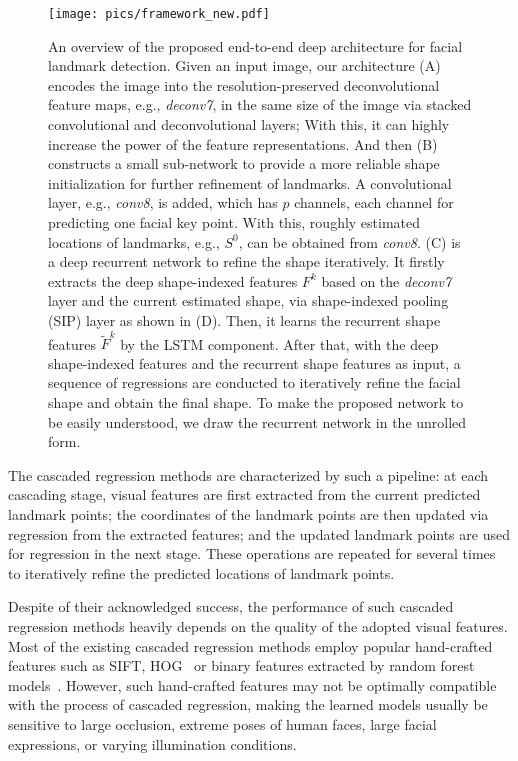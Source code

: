 \documentclass[journal]{IEEEtran}
\begin{document}
\begin{figure*}
\centering
    \texttt{[image: pics/framework\_new.pdf]}
  \caption{An overview of the proposed end-to-end deep architecture for facial landmark detection. Given an input image, our architecture (A) encodes the image into the resolution-preserved deconvolutional feature maps, e.g., \textit{deconv7}, in the same size of the image via stacked convolutional and deconvolutional layers; With this, it can highly increase the power of the feature representations. And then (B) constructs a small sub-network to provide a more reliable shape initialization for further refinement of landmarks. A convolutional layer, e.g., \textit{conv8}, is added, which has $p$ channels, each channel for predicting one facial key point. With this, roughly estimated locations of landmarks, e.g., $S^0$, can be obtained from \textit{conv8}. (C) is a deep recurrent network to refine the shape iteratively. It firstly extracts the deep shape-indexed features $F^k$ based on the \textit{deconv7} layer and the current estimated shape, via shape-indexed pooling (SIP) layer as shown in (D). Then, it learns the recurrent shape features $\widetilde{F}^{k}$ by the LSTM component. After that, with the deep shape-indexed features and the recurrent shape features as input, a sequence of regressions are conducted to iteratively refine the facial shape and obtain the final shape. To make the proposed network to be easily understood, we draw the recurrent network in the unrolled form.}
  \label{framework}
\end{figure*}

The cascaded regression methods are characterized by such a pipeline: at each cascading stage, visual features are first extracted from the current predicted landmark points; the coordinates of the landmark points are then updated via regression from the extracted features; and the updated landmark points are used for regression in the next stage. These operations are repeated for several times to iteratively refine the predicted locations of landmark points.

Despite of their acknowledged success, the performance of such cascaded regression methods heavily depends on the quality of the adopted visual features. Most of the existing cascaded regression methods employ popular hand-crafted features such as SIFT, HOG~\cite{sdm,cfss} or binary features extracted by random forest models~\cite{lbf}. However, such hand-crafted features may not be optimally compatible with the process of cascaded regression, making the learned models usually be sensitive to large occlusion, extreme poses of human faces, large facial expressions, or varying illumination conditions.
\end{document}
